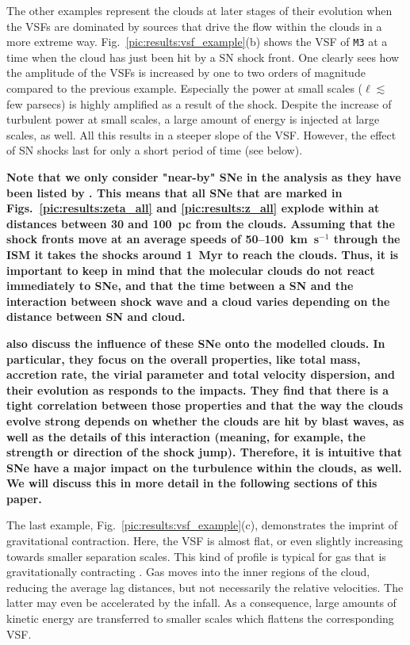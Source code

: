 The other examples represent the clouds at later stages of their evolution when the VSFs are dominated by sources that drive the flow within the clouds in a more extreme way.
Fig.~\ref{pic:results:vsf_example}(b) shows the VSF of \texttt{M3} at a time when the cloud has just been hit by a SN shock front. 
One clearly sees how the amplitude of the VSFs is increased by one to two orders of magnitude compared to the previous example.
Especially the power at small scales ($\ell \lesssim$ few parsecs) is highly amplified as a result of the shock.
Despite the increase of turbulent power at small scales, a large amount of energy is injected at large scales, as well.
All this results in a steeper slope of the VSF.
However, the effect of SN shocks last for only a short period of time (see below).

\textbf{
Note that we only consider "near-by" SNe in the analysis as they have been listed by  . 
This means that all SNe that are marked in Figs.~\ref{pic:results:zeta_all} and \ref{pic:results:z_all} explode within at distances between 30 and 100~pc from the clouds. 
Assuming that the shock fronts move at an average speeds of 50--100~km~s$^{-1}$ through the ISM it takes the shocks around 1~Myr to reach the clouds. 
Thus, it is important to keep in mind that the molecular clouds do not react immediately to SNe, and that the time between a SN and the interaction between shock wave and a cloud varies depending on the distance between SN and cloud.
}

\textbf{
	 also discuss the influence of these SNe onto the modelled clouds.
	In particular, they focus on the overall properties, like total mass, accretion rate, the virial parameter and total velocity dispersion, and their evolution as responds to the impacts.
	They find that there is a tight correlation between those properties and that the way the clouds evolve strong depends on whether the clouds are hit by blast waves, as well as the details of this interaction (meaning, for example, the strength or direction of the shock jump).
	Therefore, it is intuitive that SNe have a major impact on the turbulence within the clouds, as well. 
	We will discuss this in more detail in the following sections of this paper.
}

The last example, Fig.~\ref{pic:results:vsf_example}(c), demonstrates the imprint of gravitational contraction.
Here, the VSF is almost flat, or even slightly increasing towards smaller separation scales. 
This kind of profile is typical for gas that is gravitationally contracting \citep{Boneberg2015,Burkhart2015}.
Gas moves into the inner regions of the cloud, reducing the average lag distances, but not necessarily the relative velocities.
The latter may even be accelerated by the infall.
As a consequence, large amounts of kinetic energy are transferred to smaller scales which flattens the corresponding VSF.

